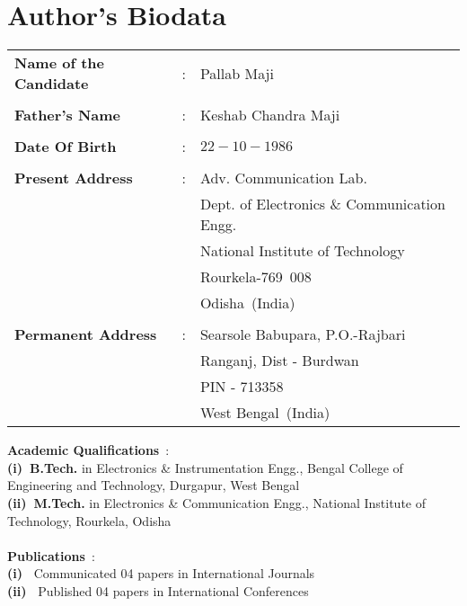 \chapter*{Author's Biodata}
\begin{center}
	\begin{table}[h!]
		\begin{tabular}{lll}
		\textbf{Name of the Candidate}&\hspace{1cm}:& Pallab Maji \\ \\
		\textbf{Father's Name}&\hspace{1cm}:& Keshab Chandra Maji \\ \\
		\textbf{Date Of Birth}&\hspace{1cm}:& $22-10-1986$ \\ \\
		\textbf{Present Address}&\hspace{1cm}:& Adv. Communication Lab.\\
		& & Dept. of Electronics \& Communication Engg. \\
		& & National Institute of Technology \\
		& & Rourkela-769~008 \\
		& & Odisha~(India) \\ \\
		\textbf{Permanent Address}&\hspace{1cm}:& Searsole Babupara, P.O.-Rajbari\\
		& & Ranganj, Dist - Burdwan \\		
		 & & PIN - 713358 \\
		 & & West Bengal~(India) 		 
		\end{tabular}
	\end{table}
\end{center}
	\textbf{Academic Qualifications}~: \\
	\textbf{(i)~B.Tech.} in Electronics \& Instrumentation Engg., Bengal College of Engineering and Technology, Durgapur, West Bengal \\
	\textbf{(ii)~M.Tech.} in Electronics \& Communication Engg., National Institute of Technology, Rourkela, Odisha\\ \\		
	\textbf{Publications}~: \\
	\textbf{(i)~} Communicated 04 papers in International Journals\\
	\textbf{(ii)~} Published 04 papers in International Conferences\\